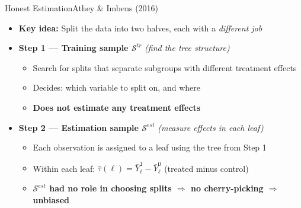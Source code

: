 \documentclass[hyperref={pdfpagelabels=false}]{beamer}
\begin{document}
\begin{frame}{Honest Estimation}{Athey \& Imbens (2016)}
	\begin{itemize}
		\item \textbf{Key idea:} Split the data into two halves, each with a \textit{different job}
		\vspace{0.35cm}
		\item \textbf{Step 1 --- Training sample $\mathcal{S}^{tr}$} \quad \textit{(find the tree structure)}
		\vspace{0.15cm}
		\begin{itemize}
			\item Search for splits that separate subgroups with different treatment effects
			\vspace{0.15cm}
			\item Decides: which variable to split on, and where
			\vspace{0.15cm}
			\item \textbf{Does not estimate any treatment effects}
		\end{itemize}
		\vspace{0.35cm}
		\item \textbf{Step 2 --- Estimation sample $\mathcal{S}^{est}$} \quad \textit{(measure effects in each leaf)}
		\vspace{0.15cm}
		\begin{itemize}
			\item Each observation is assigned to a leaf using the tree from Step 1
			\vspace{0.15cm}
			\item Within each leaf: $\hat{\tau}(\ell) = \bar{Y}^{1}_\ell - \bar{Y}^{0}_\ell$ \quad (treated minus control)
			\vspace{0.15cm}
			\item \textbf{$\mathcal{S}^{est}$ had no role in choosing splits $\Rightarrow$ no cherry-picking $\Rightarrow$ unbiased}
		\end{itemize}
	\end{itemize}
\end{frame}
\end{document}
